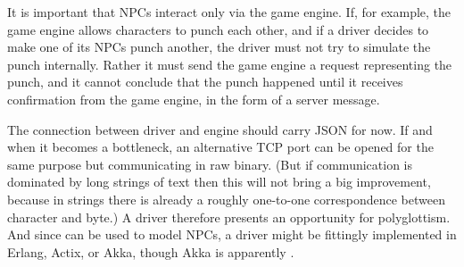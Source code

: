 It is important that NPCs interact only via the game engine.
If, for example, the game engine allows characters to punch each other,
and if a driver decides to make one of its NPCs punch another, the driver
must not try to simulate the punch internally.
Rather it must send the game engine a request representing the punch, and it
cannot conclude that the punch happened until it receives confirmation from the
game engine, in the form of a server message.

The connection between driver and engine should carry JSON for now.
If and when it becomes a bottleneck, an alternative TCP port can be opened for
the same purpose but communicating in raw binary.
(But if communication is dominated by long strings of text then this will not
bring a big improvement, because in strings there is already a roughly
one-to-one correspondence between character and byte.)
A driver therefore presents an opportunity for polyglottism.
And since
 can be used to
model NPCs, a driver might be fittingly implemented in Erlang, Actix,
or Akka, though Akka is apparently
.
